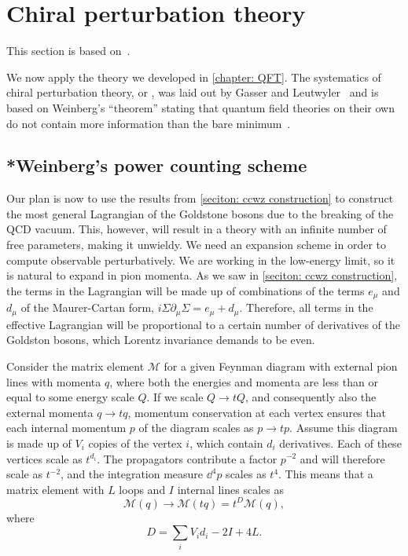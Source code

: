 \section{Chiral perturbation theory}
\label{section: chiral perturbation theory}

This section is based on~\autocite{weinbergPhenomenologicalLagrangians1979a,gasserChiralPerturbationTheory1984,gasserChiralPerturbationTheory1985,eckerChiralPerturbationTheory1995,fearingExtensionChiralPerturbation1996,schererIntroductionChiralPerturbation2002}.


We now apply the theory we developed in \autoref{chapter: QFT}.
The systematics of chiral perturbation theory, or \chpt, was laid out by Gasser and Leutwyler~\autocite{gasserChiralPerturbationTheory1984,gasserChiralPerturbationTheory1985} and is based on Weinberg's ``theorem'' stating that quantum field theories on their own do not contain more information than the bare minimum~\autocite{weinbergPhenomenologicalLagrangians1979a}.


\subsection{*Weinberg's power counting scheme}
\label{subsection: Weinberg's power counting scheme}


Our plan is now to use the results from \autoref{seciton: ccwz construction} to construct the most general Lagrangian of the Goldstone bosons due to the breaking of the QCD vacuum.
This, however, will result in a theory with an infinite number of free parameters, making it unwieldy.
We need an expansion scheme in order to compute observable perturbatively.
We are working in the low-energy limit, so it is natural to expand in pion momenta.
As we saw in \autoref{seciton: ccwz construction}, the terms in the Lagrangian will be made up of combinations of the terms $e_\mu$ and $d_\mu$ of the Maurer-Cartan form, $i\Sigma \partial_\mu \Sigma = e_\mu + d_\mu$.
Therefore, all terms in the effective Lagrangian will be proportional to a certain number of derivatives of the Goldston bosons, which Lorentz invariance demands to be even.

Consider the matrix element $\mathcal M$ for a given Feynman diagram with external pion lines with momenta $q$, where both the energies and momenta are less than or equal to some energy scale $Q$.
If we scale $Q\rightarrow tQ$, and consequently also the external momenta $q \rightarrow tq$, momentum conservation at each vertex ensures that each internal momentum $p$ of the diagram scales as $p \rightarrow tp$.
Assume this diagram is made up of $V_i$ copies of the vertex $i$, which contain $d_i$ derivatives.
Each of these vertices scale as $t^{d_i}$.
The propagators contribute a factor $p^{-2}$ and will therefore scale as $t^{-2}$, and the integration measure $\dd^4 p$ scales as $t^4$.
This means that a matrix element with $L$ loops and $I$ internal lines scales as
%
\begin{equation}
    \mathcal M(q) \rightarrow \mathcal M(t q) = t^D \mathcal M(q),
\end{equation}
%
where 
\begin{equation}
    D = \sum_i V_i d_i - 2 I + 4 L.
\end{equation}
%

